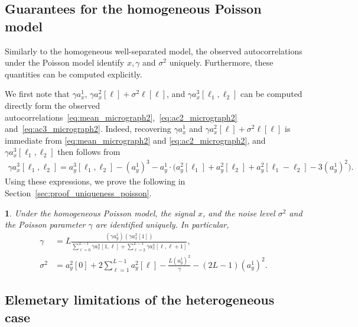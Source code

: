 \documentclass[12pt]{article}
\newcommand{\1}{\mathbf{1}}
\newcommand{\TODO}[1]{{\color{red}{[#1]}}}
\theoremstyle{plain}
\theoremstyle{definition}
\theoremstyle{remark}
\theoremstyle{plain}
\theoremstyle{remark}
\theoremstyle{plain}
\theoremstyle{plain}
\theoremstyle{plain}
\newtheorem{proposition}[thm]{\protect\propositionname}
\providecommand{\propositionname}{Proposition}
\numberwithin{equation}{section}
\begin{document}
\subsection{Guarantees for the homogeneous Poisson model} \label{sec:theory_homogeneous_poisson}

Similarly to the homogeneous well-separated model, the observed autocorrelations under the Poisson model identify $x,\gamma$ and $\sigma^2$ uniquely. Furthermore, these quantities can be computed explicitly. 

We first note that $\gamma a_x^1$, $\gamma a_x^2[\ell] + \sigma^2 \ell[\ell]$, and $\gamma a_x^3[\ell_1,\ell_2]$ can be computed directly form the observed autocorrelations~\eqref{eq:mean_micrograph2},~\eqref{eq:ac2_micrograph2} and~\eqref{eq:ac3_micrograph2}.
 Indeed, recovering  $\gamma a_x^1$ and $\gamma a_x^2[\ell] + \sigma^2 \ell[\ell]$ is immediate from \eqref{eq:mean_micrograph2} and \eqref{eq:ac2_micrograph2}, and $\gamma a_x^3[\ell_1,\ell_2]$ then follows from
%
\begin{align}
\gamma a_x^3[\ell_1,\ell_2]
= a_y^3[\ell_1,\ell_2] - (a_y^1)^3
- a_y^1 \cdot \big(a_y^2[\ell_1]  
+ a_y^2[\ell_2] + a_y^2[\ell_1-\ell_2]- 3(a_y^1)^2 \big).
\end{align}
Using these expressions, we prove the following in Section~\ref{sec:proof_uniqueness_poisson}.
\begin{proposition} \label{prop:uniqueness_poisson}
Under the homogeneous Poisson model, the signal $x$, and the noise level $\sigma^2$ and the Poisson parameter $\gamma$ are identified uniquely. 
In particular, 
	\begin{align}
\gamma &= L \frac{(\gamma a_y^1) (\gamma a_x^2[1])}
{\sum_{\ell=0}^{L-1} \gamma a_x^3[1,\ell] 
	+ \sum_{\ell=2}^{L-1} \gamma a_x^3[\ell,\ell+1]}, \\
\sigma^2 &= a_y^2[0] + 2\sum_{\ell = 1}^{L-1}a_y^2[\ell]-\frac{L (a^1_y)^2}{\gamma}
- (2 L - 1) (a_y^1)^2.
\end{align}
\end{proposition}

\subsection{Elemetary limitations of the heterogeneous case}
\label{sec:heterogeneity}

\TODO{Check and specify if this holds for both models}
\TODO{Did we define densities $\gamma_k$?}
\TODO{We write the section for the well-separated model, but it would be the same for the Poisson model}
\end{document}
